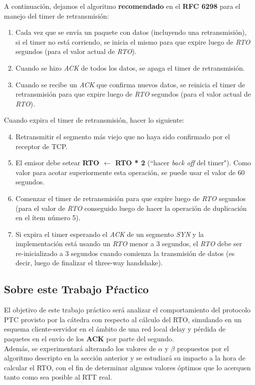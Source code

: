 \indent A continuación, dejamos el algoritmo \textbf{recomendado} en el
\textbf{RFC 6298} para el manejo del timer de retransmisión:
\begin{enumerate}
 \item Cada vez que se envía un paquete con datos (incluyendo una
	retransmisión), si el timer no está corriendo, se inicia el mismo para
	que expire luego de \textit{RTO} segundos (para el valor actual de
	\textit{RTO}).
 \item Cuando se hizo \textit{ACK} de todos los datos, se apaga el timer de
	retransmisión.
 \item Cuando se recibe un \textit{ACK} que confirma nuevos datos, se reinicia
	el timer de retransmisión para que expire luego de \textit{RTO}
	segundos (para el valor actual de \textit{RTO}).
\end{enumerate}
Cuando expira el timer de retransmisión, hacer lo siguiente:
\begin{enumerate}
 \setcounter{enumi}{3}
 \item Retransmitir el segmento más viejo que no haya sido confirmado
	por el receptor de TCP.
 \item El emisor debe setear \textbf{RTO $\leftarrow$ RTO * 2} (``hacer
	\textit{back off} del timer"). Como valor para acotar superiormente
	esta operación, se puede usar el valor de 60 segundos.
 \item Comenzar el timer de retransmisión para que expire luego de \textit{RTO}
	segundos (para el valor de \textit{RTO} conseguido luego de hacer la
	operación de duplicación en el ítem número 5).
 \item Si expira el timer esperando el \textit{ACK} de un segmento \textit{SYN}
	y la implementación está usando un \textit{RTO} menor a 3 segundos, el
	\textit{RTO} debe ser re-inicializado a 3 segundos cuando comienza la
	transmisión de datos (es decir, luego de finalizar el three-way 
handshake).
\end{enumerate}

\subsection{Sobre este Trabajo Pŕactico}

\indent El objetivo de este trabajo práctico será analizar el comportamiento del protocolo PTC provisto por la cátedra con respecto al cálculo del RTO, simulando en un esquema cliente-servidor en el ámbito de una red local delay y pérdida de paquetes en el envío de los \textbf{ACK} por parte del segundo.\\

\indent Además, se experimentará alterando los valores de $\alpha$ y $\beta$ propuestos por el algoritmo descripto en la sección anterior y se estudiará su impacto a la hora de calcular el RTO, con el fin de determinar algunos valores óptimos que lo acerquen tanto como sea posible al RTT real.
